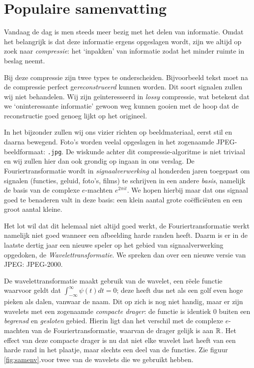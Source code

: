 \chapter{Populaire samenvatting}

Vandaag de dag is men steeds meer bezig met het delen van informatie. Omdat het belangrijk is dat deze informatie ergens opgeslagen wordt, zijn we altijd op zoek naar \emph{compressie}: het `inpakken' van informatie zodat het minder ruimte in beslag neemt.

Bij deze compressie zijn twee types te onderscheiden. Bijvoorbeeld tekst moet na de compressie perfect ge\emph{reconstrueerd} kunnen worden. Dit soort signalen zullen wij niet behandelen. Wij zijn ge\"interesseerd in \emph{lossy} compressie, wat betekent dat we `oninteressante informatie' gewoon weg kunnen gooien met de hoop dat de reconstructie goed genoeg lijkt op het origineel.

In het bijzonder zullen wij ons vizier richten op beeldmateriaal, eerst stil en daarna bewegend. Foto's worden veelal opgeslagen in het zogenaamde JPEG-beeldformaat: \texttt{.jpg}. De wiskunde achter dit compressie-algoritme is niet triviaal en wij zullen hier dan ook grondig op ingaan in ons verslag. De Fouriertransformatie wordt in \emph{signaalverwerking} al honderden jaren toegepast om signalen (functies, geluid, foto's, films) te schrijven in een andere \emph{basis}, namelijk de basis van de complexe $e$-machten $e^{2 \pi i t}$. We hopen hierbij maar dat ons signaal goed te benaderen valt in deze basis: een klein aantal grote co\"effici\"enten en een groot aantal kleine.

Het lot wil dat dit helemaal niet altijd goed werkt, de Fouriertransformatie werkt namelijk niet goed wanneer een afbeelding harde randen heeft.
Daarm is er in de laatste dertig jaar een nieuwe speler op het gebied van signaalverwerking opgedoken, de \mbox{\emph{Wavelettransformatie}}. 
We spreken dan over een nieuwe versie van JPEG: JPEG-2000.
 
De wavelettransformatie maakt gebruik van de wavelet, een r\"eele functie waarvoor geldt dat $\int_{-\infty}^\infty \psi(t) dt = 0$;
deze heeft dus net als een golf even hoge pieken als dalen, vanwaar de naam.
Dit op zich is nog niet handig, maar er zijn wavelets met een zogenaamde \emph{compacte drager}:
de functie is identiek $0$ buiten een \emph{begrensd} en \emph{gesloten} gebied. 
Hierin ligt dan het verschil met de complexe $e$-machten van de Fouriertransformatie, waarvan de drager gelijk is aan $\mathbb{R}$. 
Het effect van deze compacte drager is nu dat niet elke wavelet last heeft van een harde rand in het plaatje, maar slechts een deel van de functies.
Zie figuur \ref{fig:samenv}.voor twee van de wavelets die we gebruikt hebben.

